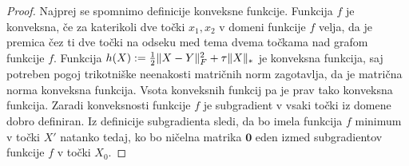 \begin{proof} 
Najprej se spomnimo definicije konveksne funkcije. Funkcija $f$ je konveksna, če za katerikoli dve točki $x_1, x_2$ v domeni funkcije $f$ velja, da je premica čez ti dve točki na odseku med tema dvema točkama nad grafom funkcije $f$.
Funkcija $h(X) := \frac{1}{2} \lVert X-Y\rVert_F^2 + \tau\lVert X\rVert_* $ je konveksna funkcija, saj potreben pogoj trikotniške neenakosti matričnih norm zagotavlja, da je matrična norma konveksna funkcija. Vsota konveksnih funkcij pa je prav tako konveksna funkcija. 
Zaradi konveksnosti funkcije $f$ je 
subgradient v vsaki točki iz domene dobro definiran.
 
Iz definicije subgradienta sledi, da bo imela funkcija $f$ minimum v točki $X'$ natanko tedaj,
ko bo ničelna matrika $\mathbf{0}$ eden izmed subgradientov funkcije $f$ v točki $X_0$.
\iffalse 
V minimumu funkcije $f$ bo eden od subgradientov iščemo minimum $X'$ funkcije $f$,  iščemo tako točko $X'$, da bo
\CG{eden izmed subgradientov po spremenljivki $X$} v točki $X'$ enak 0.  
\fi 


\end{proof}
